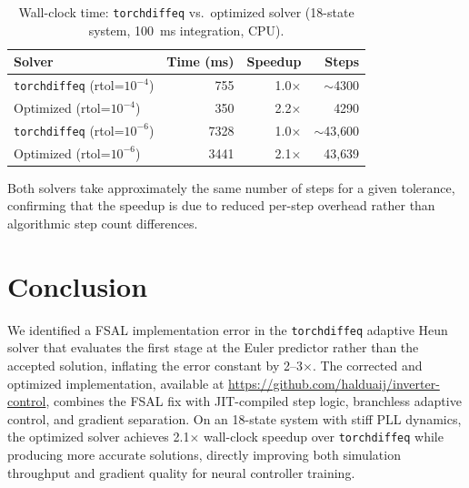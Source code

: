 \documentclass[11pt]{article}
\begin{document}
\begin{table}[t]
\centering
\caption{Wall-clock time: \texttt{torchdiffeq} vs.\ optimized solver
(18-state system, 100~ms integration, CPU).}
\label{tab:perf}
\small
\begin{tabular}{lrrr}
\toprule
\textbf{Solver} & \textbf{Time (ms)} & \textbf{Speedup} & \textbf{Steps} \\
\midrule
\texttt{torchdiffeq} (rtol=$10^{-4}$) & 755 & 1.0$\times$ & $\sim$4300 \\
Optimized (rtol=$10^{-4}$)             & 350 & 2.2$\times$ & 4290 \\
\midrule
\texttt{torchdiffeq} (rtol=$10^{-6}$) & 7328 & 1.0$\times$ & $\sim$43{,}600 \\
Optimized (rtol=$10^{-6}$)             & 3441 & 2.1$\times$ & 43{,}639 \\
\bottomrule
\end{tabular}
\end{table}

Both solvers take approximately the same number of steps for a given
tolerance, confirming that the speedup is due to reduced per-step
overhead rather than algorithmic step count differences.

\section{Conclusion}
\label{sec:conclusion}

We identified a FSAL implementation error in the \texttt{torchdiffeq}
adaptive Heun solver that evaluates the first stage at the Euler
predictor rather than the accepted solution, inflating the error
constant by 2--3$\times$.  The corrected and optimized implementation,
available at \url{https://github.com/halduaij/inverter-control},
combines the FSAL fix with JIT-compiled step logic, branchless
adaptive control, and gradient separation.  On an 18-state system
with stiff PLL dynamics, the optimized solver achieves 2.1$\times$
wall-clock speedup over \texttt{torchdiffeq} while producing more
accurate solutions, directly improving both simulation throughput and
gradient quality for neural controller training.


\end{document}

